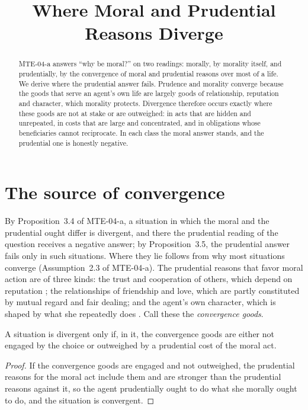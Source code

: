 \documentclass{situationist-preprint}
\title{Where Moral and Prudential Reasons Diverge}
\begin{document}
\maketitle

\begin{abstract}
MTE-04-a answers \enquote{why be moral?} on two readings: morally, by morality itself, and prudentially, by the convergence of moral and prudential reasons over most of a life. We derive where the prudential answer fails. Prudence and morality converge because the goods that serve an agent's own life are largely goods of relationship, reputation and character, which morality protects. Divergence therefore occurs exactly where these goods are not at stake or are outweighed: in acts that are hidden and unrepeated, in costs that are large and concentrated, and in obligations whose beneficiaries cannot reciprocate. In each class the moral answer stands, and the prudential one is honestly negative.
\end{abstract}

\section{The source of convergence}\label{s:src}

By Proposition~3.4 of MTE-04-a, a situation in which the moral and the prudential ought differ is divergent, and there the prudential reading of the question receives a negative answer; by Proposition~3.5, the prudential answer fails only in such situations. Where they lie follows from why most situations converge (Assumption~2.3 of MTE-04-a). The prudential reasons that favor moral action are of three kinds: the trust and cooperation of others, which depend on reputation \citep[ch.~15]{Hobbes1651}; the relationships of friendship and love, which are partly constituted by mutual regard and fair dealing; and the agent's own character, which is shaped by what she repeatedly does \citep[II.1]{AristotleNE}. Call these the \emph{convergence goods}.

\begin{proposition}\label{p:where}
A situation is divergent only if, in it, the convergence goods are either not engaged by the choice or outweighed by a prudential cost of the moral act.
\end{proposition}

\begin{proof}
If the convergence goods are engaged and not outweighed, the prudential reasons for the moral act include them and are stronger than the prudential reasons against it, so the agent prudentially ought to do what she morally ought to do, and the situation is convergent.
\end{proof}
\end{document}

